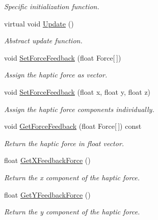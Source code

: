 \begin{DoxyCompactItemize}
\begin{DoxyCompactList}\small\item\em Specific initialization function. \item\end{DoxyCompactList}\item 
virtual void \hyperlink{classvtkToolLaparoscopy_a4445a0cfabd77b50a06929b04cb71f9e}{Update} ()
\begin{DoxyCompactList}\small\item\em Abstract update function. \item\end{DoxyCompactList}\item 
void \hyperlink{classvtkToolLaparoscopy_a9bbfa040ca224472e6c669a3c27d9977}{SetForceFeedback} (float Force\mbox{[}$\,$\mbox{]})
\begin{DoxyCompactList}\small\item\em Assign the haptic force as vector. \item\end{DoxyCompactList}\item 
void \hyperlink{classvtkToolLaparoscopy_aa716d470104640646068eaa160a7adf2}{SetForceFeedback} (float x, float y, float z)
\begin{DoxyCompactList}\small\item\em Assign the haptic force components individually. \item\end{DoxyCompactList}\item 
void \hyperlink{classvtkToolLaparoscopy_abc10b86fce49b9260bb3d43e6a3a0166}{GetForceFeedback} (float Force\mbox{[}$\,$\mbox{]}) const 
\begin{DoxyCompactList}\small\item\em Return the haptic force in float vector. \item\end{DoxyCompactList}\item 
float \hyperlink{classvtkToolLaparoscopy_aa891d5e424ce8c57a49b0631dfdfaa93}{GetXFeedbackForce} ()
\begin{DoxyCompactList}\small\item\em Return the x component of the haptic force. \item\end{DoxyCompactList}\item 
float \hyperlink{classvtkToolLaparoscopy_a44acfb672a0526b9628372c19249c41c}{GetYFeedbackForce} ()
\begin{DoxyCompactList}\small\item\em Return the y component of the haptic force. \item\end{DoxyCompactList}\item 

\end{DoxyCompactItemize}
